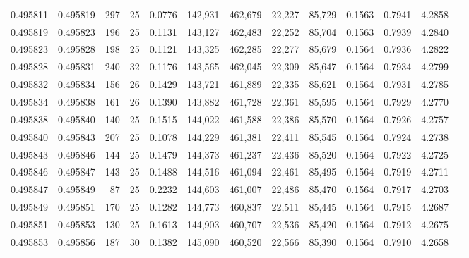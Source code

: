 \begin{tabular}{rrrrrrrrrrrrr}
0.495811 & 0.495819 & 297 &  25 &                                     0.0776 & 142,931 & 462,679 &  22,227 &  85,729 & 0.1563 & 0.7941 & 4.2858 \\
0.495819 & 0.495823 & 196 &  25 &                                     0.1131 & 143,127 & 462,483 &  22,252 &  85,704 & 0.1563 & 0.7939 & 4.2840 \\
0.495823 & 0.495828 & 198 &  25 &                                     0.1121 & 143,325 & 462,285 &  22,277 &  85,679 & 0.1564 & 0.7936 & 4.2822 \\
0.495828 & 0.495831 & 240 &  32 &                                     0.1176 & 143,565 & 462,045 &  22,309 &  85,647 & 0.1564 & 0.7934 & 4.2799 \\
0.495832 & 0.495834 & 156 &  26 &                                     0.1429 & 143,721 & 461,889 &  22,335 &  85,621 & 0.1564 & 0.7931 & 4.2785 \\
0.495834 & 0.495838 & 161 &  26 &                                     0.1390 & 143,882 & 461,728 &  22,361 &  85,595 & 0.1564 & 0.7929 & 4.2770 \\
0.495838 & 0.495840 & 140 &  25 &                                     0.1515 & 144,022 & 461,588 &  22,386 &  85,570 & 0.1564 & 0.7926 & 4.2757 \\
0.495840 & 0.495843 & 207 &  25 &                                     0.1078 & 144,229 & 461,381 &  22,411 &  85,545 & 0.1564 & 0.7924 & 4.2738 \\
0.495843 & 0.495846 & 144 &  25 &                                     0.1479 & 144,373 & 461,237 &  22,436 &  85,520 & 0.1564 & 0.7922 & 4.2725 \\
0.495846 & 0.495847 & 143 &  25 &                                     0.1488 & 144,516 & 461,094 &  22,461 &  85,495 & 0.1564 & 0.7919 & 4.2711 \\
0.495847 & 0.495849 &  87 &  25 &                                     0.2232 & 144,603 & 461,007 &  22,486 &  85,470 & 0.1564 & 0.7917 & 4.2703 \\
0.495849 & 0.495851 & 170 &  25 &                                     0.1282 & 144,773 & 460,837 &  22,511 &  85,445 & 0.1564 & 0.7915 & 4.2687 \\
0.495851 & 0.495853 & 130 &  25 &                                     0.1613 & 144,903 & 460,707 &  22,536 &  85,420 & 0.1564 & 0.7912 & 4.2675 \\
0.495853 & 0.495856 & 187 &  30 &                                     0.1382 & 145,090 & 460,520 &  22,566 &  85,390 & 0.1564 & 0.7910 & 4.2658 \\

\end{tabular}
